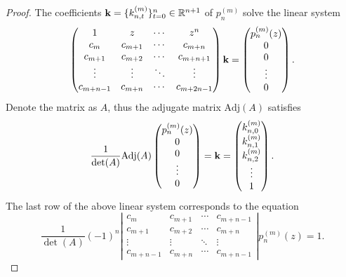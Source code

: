 \begin{proof}
    The coefficients $\mathbf k = \{k_{n, t}^{(m)}\}_{t=0}^n\in \mathbb R^{n+1}$ of $p_n^{(m)}$ solve the linear system
    \begin{equation}
      \begin{pmatrix}
            1 & z & \cdots & z^n \\
            c_m & c_{m+1} & \cdots & c_{m+n}\\
            c_{m+1} & c_{m+2} & \cdots & c_{m+n+1}\\
            \vdots & \vdots & \ddots & \vdots \\
            c_{m+n-1} & c_{m+n} & \cdots & c_{m+2n-1} 
      \end{pmatrix} \mathbf k = \begin{pmatrix}
          p_n^{(m)}(z) \\ 0 \\ 0 \\ \vdots \\ 0
      \end{pmatrix}.
    \end{equation}
    Denote the matrix as $A$, thus the adjugate matrix $\text{Adj}(A)$ satisfies 
    \begin{equation}
        \frac{1}{\det(A)} \text{Adj}(A)  \begin{pmatrix}
          p_n^{(m)}(z) \\ 0 \\ 0 \\ \vdots \\ 0
      \end{pmatrix} = \mathbf k = \begin{pmatrix}
          k_{n, 0}^{(m)} \\ k_{n, 1}^{(m)} \\ k_{n, 2}^{(m)} \\ \vdots \\ 1
      \end{pmatrix}.
    \end{equation}
    The last row of the above linear system corresponds to the equation 
    \begin{equation}
        \frac{1}{\det(A)} (-1)^n \left| \begin{matrix}
            c_m & c_{m+1} & \cdots & c_{m+n-1} \\
            c_{m+1} & c_{m+2} & \cdots & c_{m+n} \\ 
            \vdots & \vdots & \ddots & \vdots \\
            c_{m+n-1} & c_{m+n} & \cdots & c_{m+n-1}
        \end{matrix}\right| p_n^{(m)}(z) = 1.
    \end{equation}
\end{proof}

